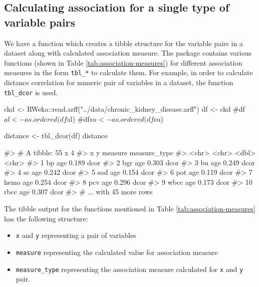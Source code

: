 \hypertarget{calculating-association-for-a-single-type-of-variable-pairs}{%
\subsection{Calculating association for a single type of variable
pairs}\label{calculating-association-for-a-single-type-of-variable-pairs}}

We have a function which creates a tibble structure for the variable
pairs in a dataset along with calculated association measure. The
package contains various functions (shown in Table
\ref{tab:association-measures}) for different association measures in
the form \texttt{tbl\_*} to calculate them. For example, in order to
calculate distance correlation for numeric pair of variables in a
dataset, the function \texttt{tbl\_dcor} is used.

\begin{Schunk}
\begin{Sinput}
ckd <- RWeka::read.arff("../data/chronic_kidney_disease.arff")
df <- ckd
#df$al <- as.ordered(df$al)
#df$su <- as.ordered(df$su)

distance <- tbl_dcor(df)
distance
\end{Sinput}
\begin{Soutput}
#> # A tibble: 55 x 4
#>    x     y     measure measure_type
#>    <chr> <chr>   <dbl> <chr>       
#>  1 bp    age     0.189 dcor        
#>  2 bgr   age     0.303 dcor        
#>  3 bu    age     0.249 dcor        
#>  4 sc    age     0.242 dcor        
#>  5 sod   age     0.154 dcor        
#>  6 pot   age     0.119 dcor        
#>  7 hemo  age     0.254 dcor        
#>  8 pcv   age     0.296 dcor        
#>  9 wbcc  age     0.173 dcor        
#> 10 rbcc  age     0.307 dcor        
#> # ... with 45 more rows
\end{Soutput}
\end{Schunk}

The tibble output for the functions mentioned in Table
\ref{tab:association-measures} has the following structure:

\begin{itemize}
\tightlist
\item
  \texttt{x} and \texttt{y} representing a pair of variables
\item
  \texttt{measure} representing the calculated value for association
  measure
\item
  \texttt{measure\_type} representing the association measure calculated
  for \texttt{x} and \texttt{y} pair.
\end{itemize}


